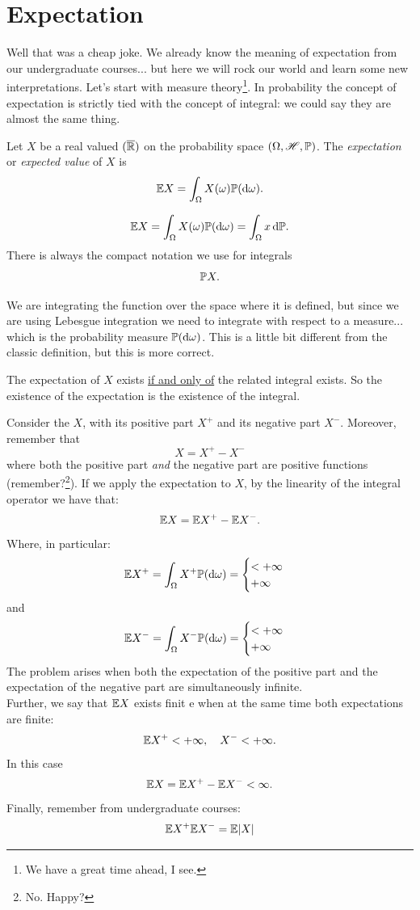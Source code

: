 \documentclass{report}
\begin{document}
\section{Expectation}
Well that was a cheap joke. We already know the meaning of expectation from our undergraduate courses... but here we will rock our world and learn some new interpretations. Let's start with measure theory\footnote{We have a great time ahead, I see.}. In probability the concept of expectation is strictly tied with the concept of integral: we could say they are almost the same thing.
\begin{definition}
	Let $X$ be a real valued $(\overline{\mathbb{R}})$ \rv{} on the probability space $(\Omega,\mathscr{H},\mathbb{P})$. The \emph{expectation} or \emph{expected value} of $X$ is
	\[\mathbb{E} X=\int_\Omega X(\omega)\mathbb{P}(\mathop{}\!\mathrm{d}\omega).\]
\end{definition}
	\begin{notation}
		\[\mathbb{E} X=\int_\Omega X(\omega)\mathbb{P}(\mathop{}\!\mathrm{d}\omega)=\int_\Omega x\mathop{}\!\mathrm{d}\mathbb{P}.\]
		There is always the compact notation we use for integrals
		\[\mathbb{P} X.\]
	\end{notation}
We are integrating the function over the space where it is defined, but since we are using Lebesgue integration we need to integrate with respect to a measure... which is the probability measure $\mathbb{P}(\mathop{}\!\mathrm{d}\omega)$. This is a little bit different from the classic definition, but this is more correct.
\begin{remark}
	The expectation of $X$ exists \underline{if and only of} the related integral exists. So the existence of the expectation is the existence of the integral.\\
\end{remark}
Consider the \rv{} $X$, with its positive part $X^+$ and its negative part $X^-$. Moreover, remember that 
\[X=X^+-X^-\]
where both the positive part \textit{and} the negative part are positive functions (remember?\footnote{No. Happy?}). If we apply the expectation to $X$, by the linearity of the integral operator we have that:
\[\mathbb{E} X=\mathbb{E} X^+-\mathbb{E} X^-.\]
Where, in particular:
\[\mathbb{E} X^+=\int_\Omega X^+\mathbb{P}(\mathop{}\!\mathrm{d}\omega)=\begin{cases}
	<+\infty\\
	+\infty
\end{cases}\]
and
\[\mathbb{E} X^-=\int_\Omega X^-\mathbb{P}(\mathop{}\!\mathrm{d}\omega)=\begin{cases}
	<+\infty\\
	+\infty
\end{cases}\]
The problem arises when both the expectation of the positive part and the expectation of the negative part are simultaneously infinite.\\
Further, we say that $\mathbb{E} X$ exists finit e when at the same time both expectations are finite: 
\[\mathbb{E} X^+<+\infty,\quad X^-<+\infty.\]
In this case
\[\mathbb{E} X=\mathbb{E} X^+-\mathbb{E} X^-<\infty.\]
Finally, remember from undergraduate courses:
\[\mathbb{E} X^+\mathbb{E} X^-=\mathbb{E} |X|\]
\end{document}
